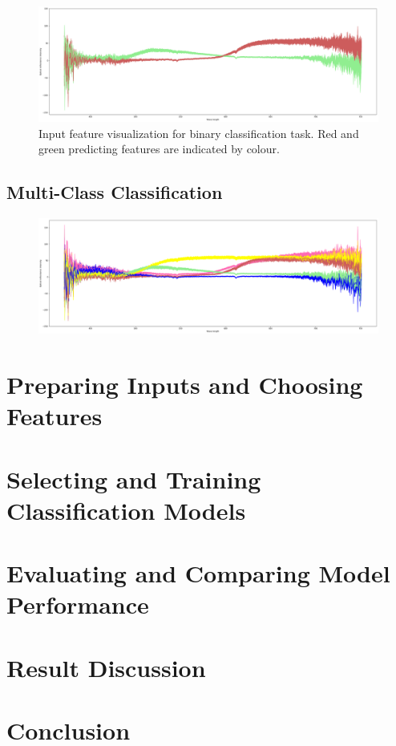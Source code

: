 \documentclass[11pt]{article}
\begin{document}
			\begin{figure}[H]
				\includegraphics[width=1\textwidth]{png/binary_default}
				\caption{Input feature visualization for binary classification task. Red and green predicting features are indicated by colour.}
				\label{fig:binary}
			\end{figure}

		\subsection{Multi-Class Classification}

		\begin{figure}[H]
			\includegraphics[width=1\textwidth]{png/multi_default}
			\caption{}
			\label{fig:milti}
		\end{figure}

	\section{Preparing Inputs and Choosing Features}
	\section{Selecting and Training Classification Models}
	\section{Evaluating and Comparing Model Performance}
	\section{Result Discussion}


	\section{Conclusion}
	
\end{document}
